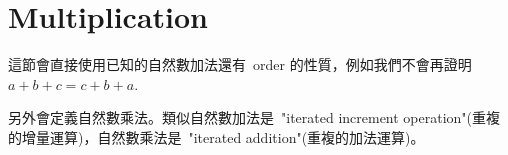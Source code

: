 \section{Multiplication}\label{sec 2.3}

\begin{note}
這節會直接使用已知的自然數加法還有\ order 的性質，例如我們不會再證明\ \(a + b + c = c + b + a\).

另外會定義自然數乘法。類似自然數加法是\ "iterated increment operation"(重複的增量運算)，自然數乘法是\ "iterated addition"(重複的加法運算)。
\end{note}